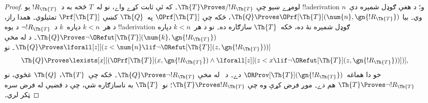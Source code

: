 \documentclass[../../../include/open-logic-section]{subfiles}
\begin{document}
\begin{proof}
لومړے ښيو چې $\Th{T} \Proves/ !R_{\Th{T}}$۔ که ئې ثابت کړے
واے، نو له~$T$ څخه به د~$!R_{\Th{T}}$ يو !!a{derivation} و؛ د
هغې ګوډل شمېره دې~$n$ وي۔ بيا
$\Th{Q} \Proves \OPrf[\Th{T}](\num{n}, \gn{!R_{\Th{T}}})$، ځکه چې
$\OPrf[\Th{T}]$ په~$\Th{Q}$ کښې $\Prf[\Th{T}]$ تمثيلوي۔ همدا
راز، د هر~$k < n$ دپاره~$k$ د~$\lnot !R_{\Th{T}}$ د يوه
!!a{derivation} ګوډل شمېره نۀ ده، ځکه~$\Th{T}$ سازګاره ده۔ نو د
هر~$k < n$ دپاره
$\Th{Q} \Proves \lnot
\ORefut[\Th{T}](\num{k}, \gn{!R_{\Th{T}}})$۔ د
 له مخې
$\Th{Q} \Proves \lforall[z][(z < \num{n} \lif \lnot \ORefut[\Th{T}](z,
  \gn{!R_{\Th{T}}}))]$۔ نو
\[
\Th{Q} \Proves \lexists[x][(\OPrf[\Th{T}](x,\gn{!R_{\Th{T}}}) \land \lforall[z][(z
    < x \lif \lnot \ORefut[\Th{T}](z,\gn{!R_{\Th{T}}}))])],
\]
خو دا هماغه~$\ORProv[\Th{T}](\gn{!R_{\Th{T}}})$ دے۔ د~
له مخې $\Th{Q}
\Proves \lnot !R_{\Th{T}}$۔ ځکه چې~$\Th{T}$، $\Th{Q}$ غځوي،
نو $\Th{T}
\Proves \lnot !R_{\Th{T}}$ هم دے۔ موږ فرض کړې وه چې
$\Th{T} \Proves !R_{\Th{T}}$؛ نو~$\Th{T}$ به ناسازګاره شي، چې د
قضيې له فرض سره ټکر لري۔


\end{proof}
\end{document}
